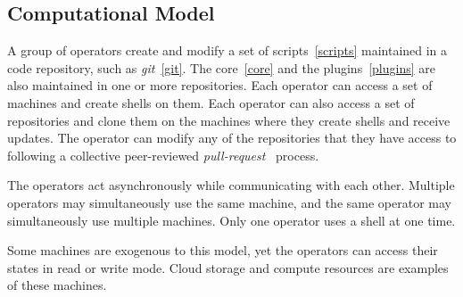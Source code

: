 \subsection{Computational Model}
\label{computation_model}

A group of operators create and modify a set of scripts~\ref{scripts} maintained in a code repository, such as \emph{git}~\ref{git}. The core~\ref{core} and the plugins~\ref{plugins} are also maintained in one or more repositories. Each operator can access a set of machines and create shells on them. Each operator can also access a set of repositories and clone them on the machines where they create shells and receive updates. The operator can modify any of the repositories that they have access to following a collective peer-reviewed \emph{pull-request}~ process.

The operators act asynchronously while communicating with each other. Multiple operators may simultaneously use the same machine, and the same operator may simultaneously use multiple machines. Only one operator uses a shell at one time. 

Some machines are exogenous to this model, yet the operators can access their states in read or write mode. Cloud storage and compute resources are examples of these machines.